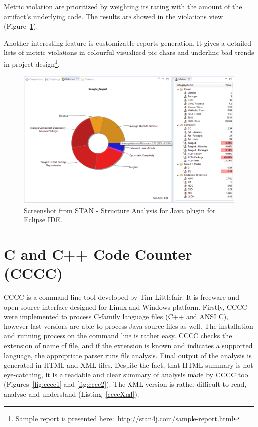 Metric violation are prioritized  by weighting its rating with the amount of the artifact's underlying code. The results are showed in the violations view (Figure~\ref{fig:stan}).

Another interesting feature is customizable reports generation. It gives a detailed lists of metric violations in colourful visualized pie chars and underline bad trends in project design\footnote{Sample report is presented here:~\url{http://stan4j.com/sample-report.html}}\cite{stan}.

\begin{figure}[h!]
	\centering
	\includegraphics[scale=0.55]{img/stan.png} 
	\caption{Screenshot from STAN - Structure Analysis for Java plugin for Eclipse IDE.}		
	\label{fig:stan}
\end{figure}

\section{C and C++ Code Counter (CCCC)}
CCCC is a command line tool developed by Tim Littlefair. It is freeware and open source interface designed for Linux and Windows platform. Firstly, CCCC were implemented to process C-family language files (C++ and ANSI C), however last versions are able to process Java source files as well. The installation and running process on the command line is rather easy. CCCC checks the extension of name of file, and if the extension is known and indicates a supported language, the appropriate parser runs file analysis. Final output of the analysis is generated in HTML and XML files. Despite the fact, that HTML summary is not eye-catching, it is a readable and clear summary of analysis made by CCCC tool (Figures~\ref{fig:cccc1} and \ref{fig:cccc2}). The XML version is rather difficult to read, analyse and understand (Listing~\ref{ccccXml}). 

